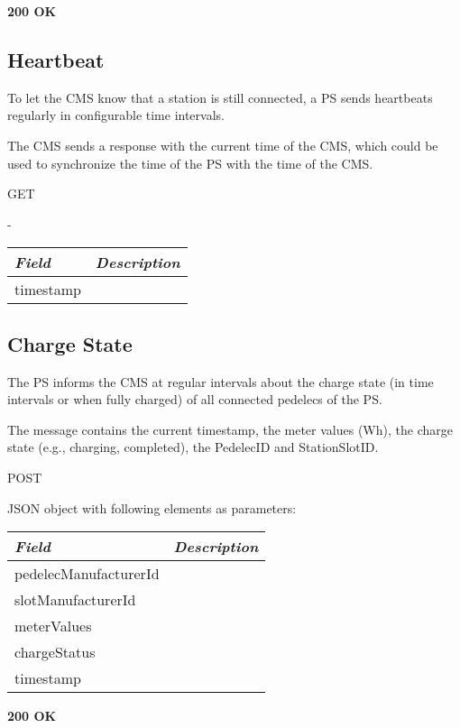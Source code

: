 \textbf{200 OK}\\

\subsection{Heartbeat}

To let the \acs{CMS} know that a station is still connected, a \acs{PS} sends heartbeats regularly in configurable time intervals.

The \acs{CMS} sends a response with the current time of the \acs{CMS}, which could be used to synchronize the time of the \acs{PS} with the time of the \acs{CMS}.


 GET

-

\begin{tabularx}{\linewidth}{ | l | X | }
  \hline
  \textit{Field} & \textit{Description} \\
  \hline \hline
  	timestamp					& \\
  	
    \hline
\end{tabularx}

\subsection{Charge State}

The \acs{PS} informs the \acs{CMS} at regular intervals about the charge state (in time intervals or when fully charged) of all connected pedelecs of the \acs{PS}.

The message contains the current timestamp, the meter values (Wh), the charge state (e.g., charging, completed), the PedelecID and StationSlotID.


 POST

JSON object with following elements as parameters:\\
\begin{tabularx}{\linewidth}{ | l | X | }
  \hline
  \textit{Field} & \textit{Description} \\
  \hline \hline
  	pedelecManufacturerId			& \\
  	slotManufacturerId					& \\
  	meterValues			& \\
  	chargeStatus			& \\
 	timestamp			& \\
  	
    \hline
\end{tabularx}

\textbf{200 OK}\\